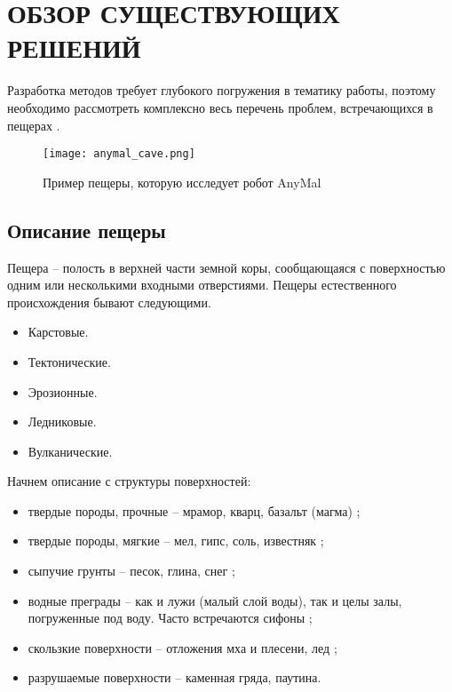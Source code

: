 \chapter{ОБЗОР СУЩЕСТВУЮЩИХ РЕШЕНИЙ}\label{ch:ch1}

Разработка методов требует глубокого погружения в тематику работы, поэтому необходимо рассмотреть комплексно весь перечень проблем, встречающихся в пещерах . 

\begin{figure}[H]
    \centering\texttt{[image: anymal\_cave.png]}
    \caption{Пример пещеры, которую исследует робот AnyMal}
    \label{fig:anymal_cave}
\end{figure}

\section{Описание пещеры}
Пещера -- полость в верхней части земной коры, сообщающаяся с поверхностью одним или несколькими входными отверстиями. Пещеры естественного происхождения бывают следующими.
\begin{itemize}
    \item Карстовые. 
    \item Тектонические.
    \item Эрозионные.
    \item Ледниковые.
    \item Вулканические.
\end{itemize}

Начнем описание с структуры поверхностей:
\begin{itemize}
    \item твердые породы, прочные -- мрамор, кварц, базальт (магма) ;
    \item твердые породы, мягкие -- мел, гипс, соль, известняк ;
    \item сыпучие грунты -- песок, глина, снег ;
    \item водные преграды -- как и лужи (малый слой воды), так и целы залы, погруженные под воду. Часто встречаются сифоны ;
    \item скользкие поверхности -- отложения мха и плесени, лед ;
    \item разрушаемые поверхности -- каменная гряда, паутина.
\end{itemize}


